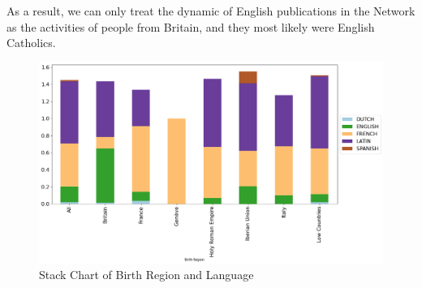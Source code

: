 \documentclass[12pt,a4paper,oneside]{book}
\begin{document}
\begin{sloppypar}
As a result, we can only treat the dynamic of English publications in the Network as the activities of people from Britain, and they most likely were English Catholics.

\begin{figure}[H]
\centering
\includegraphics[scale=0.4]{graph/Stack Chart of Birth Region and Language.png}
\caption{Stack Chart of Birth Region and Language}
\label{fig:stackLan}
\end{figure}


\end{sloppypar}
\end{document}
